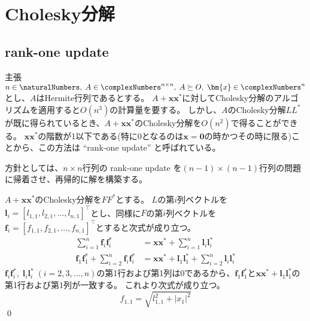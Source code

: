 \chapter{Cholesky分解}
    \section{rank-one update}
        \begin{itembox}[l]{主張}
            $n\in\naturalNumbers,\;A\in\complexNumbers^{n\times n},\;A\succeq O,\;\bm{x}\in\complexNumbers^n$とし、$A$はHermite行列であるとする。
            $A+\bm{x}\bm{x}^*$に対してCholesky分解のアルゴリズムを適用すると$O(n^3)$の計算量を要する。
            しかし、$A$のCholesky分解$LL^*$が既に得られているとき、$A+\bm{x}\bm{x}^*$のCholesky分解を$O(n^2)$で得ることができる。
            $\bm{x}\bm{x}^*$の階数が1以下である(特に0となるのは$\bm{x}=\bm{0}$の時かつその時に限る)ことから、この方法は ``rank-one update'' と呼ばれている。
        \end{itembox}
        \begin{derivation*}
            方針としては、$n\times n$行列の rank-one update を$(n-1)\times(n-1)$行列の問題に帰着させ、再帰的に解を構築する。
            \par
            $A+\bm{x}\bm{x}^*$のCholesky分解を$FF^*$とする。
            $L$の第$i$列ベクトルを$\bm{l}_i = [l_{1,1},l_{2,1},\dots,l_{n,1}]^\top$とし、同様に$F$の第$i$列ベクトルを$\bm{f}_i = [f_{1,1},f_{2,1},\dots,f_{n,1}]^\top$とすると次式が成り立つ。
            \begin{align*}
                \sum_{i=1}^n \bm{f}_i\bm{f}_i^* &= \bm{x}\bm{x}^* + \sum_{i=1}^n \bm{l}_i\bm{l}_i^* \\
                \bm{f}_1\bm{f}_1^* + \sum_{i=2}^n \bm{f}_i\bm{f}_i^* &= \bm{x}\bm{x}^* + \bm{l}_1\bm{l}_1^* + \sum_{i=2}^n \bm{l}_i\bm{l}_i^*
            \end{align*}
            $\bm{f}_i\bm{f}_i^*,\;\bm{l}_i\bm{l}_i^*\;(i=2,3,\dots,n)$の第1行および第1列は0であるから、$\bm{f}_1\bm{f}_1^*$と$\bm{x}\bm{x}^* + \bm{l}_1\bm{l}_1^*$の第1行および第1列が一致する。
            これより次式が成り立つ。
            \[ f_{1,1} = \sqrt{l_{1,1}^2 + |x_1|^2} \]
            \qed
        \end{derivation*}
